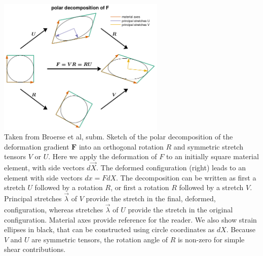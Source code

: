 \begin{center}
\includegraphics[width=8cm]{python_codes/fieldstone_89/images/polardec}\\
{\captionfont Taken from Broerse et al, subm. 
Sketch of the polar decomposition of the deformation gradient ${\bm F}$ into an orthogonal
rotation $R$ and symmetric stretch tensors $V$ or $U$. Here we apply the deformation of $F$ to an
initially square material element, with side vectors $d\vec{X}$. 
The deformed configuration (right)
leads to an element with side vectors $dx = FdX$. 
The decomposition can be written as first
a stretch $U$ followed by a rotation $R$, or first a rotation $R$ followed by a stretch $V$. 
Principal stretches $\vec\lambda$ of $V$ provide the stretch in the final, deformed, configuration, 
whereas stretches $\vec\lambda$ of $U$ provide the stretch in the original configuration. 
Material axes provide reference for the reader. 
We also show strain ellipses in black, that can be constructed using circle coordinates
as $dX$. Because $V$ and $U$ are symmetric tensors, the rotation angle of $R$ is non-zero for simple
shear contributions.}
\end{center}





